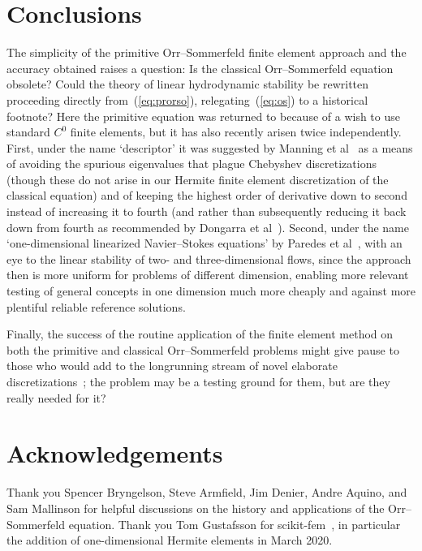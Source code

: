 \documentclass[twocolum]{afmc_art}
\begin{document}
\section{Conclusions}
The simplicity of the primitive Orr--Sommerfeld finite element approach and the accuracy obtained raises a question: Is the classical Orr--Sommerfeld equation obsolete?  Could the theory of linear hydrodynamic stability be rewritten proceeding directly from~(\ref{eq:prorso}), relegating~(\ref{eq:os}) to a historical footnote?  Here the primitive equation was returned to because of a wish to use standard $C^0$ finite elements, but it has also recently arisen twice independently.  First, under the name `descriptor' it was suggested by Manning et al~\cite{manning2007descriptor} as a means of avoiding the spurious eigenvalues that plague Chebyshev discretizations (though these do not arise in our Hermite finite element discretization of the classical equation) and of keeping the highest order of derivative down to second instead of increasing it to fourth (and rather than subsequently reducing it back down from fourth as recommended by Dongarra et al~\cite{dongarra1996chebyshev}).  Second, under the name `one-dimensional linearized Navier--Stokes equations'  by Paredes et al~\cite{paredes2013order}, with an eye to the linear stability of two- and three-dimensional flows, since the approach then is more uniform for problems of different dimension, enabling more relevant testing of general concepts in one dimension much more cheaply and against more plentiful reliable reference solutions.

Finally, the success of the routine application of the finite element method on both the primitive and classical Orr--Sommerfeld problems might give pause to those who would add to the longrunning stream of novel elaborate discretizations~\cite[e.g.]{mcbain2009numerical}; the problem may be a testing ground for them, but are they really needed for it?

\section{Acknowledgements}
Thank you Spencer Bryngelson, Steve Armfield, Jim Denier, Andre Aquino, and Sam
Mallinson for helpful discussions on the history and applications of
the Orr--Sommerfeld equation.  Thank you Tom Gustafsson for
scikit-fem~\cite{gustafsson2020scikit-fem}, in particular the addition of one-dimensional Hermite
elements in March 2020.



\end{document}

